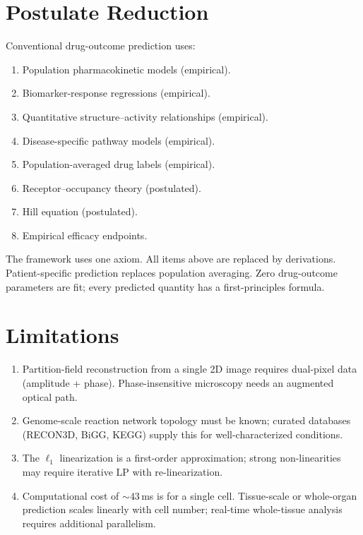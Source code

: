 \documentclass[twocolumn,10pt,a4paper]{article}
\theoremstyle{definition}
\theoremstyle{remark}
\begin{document}
\section{Postulate Reduction}

Conventional drug-outcome prediction uses:
\begin{enumerate}[leftmargin=*,nosep]
    \item Population pharmacokinetic models (empirical).
    \item Biomarker-response regressions (empirical).
    \item Quantitative structure--activity relationships (empirical).
    \item Disease-specific pathway models (empirical).
    \item Population-averaged drug labels (empirical).
    \item Receptor--occupancy theory (postulated).
    \item Hill equation (postulated).
    \item Empirical efficacy endpoints.
\end{enumerate}

The framework uses one axiom. All items above are replaced by derivations. Patient-specific prediction replaces population averaging. Zero drug-outcome parameters are fit; every predicted quantity has a first-principles formula.

\section{Limitations}

\begin{enumerate}[leftmargin=*,nosep]
    \item Partition-field reconstruction from a single 2D image requires dual-pixel data (amplitude + phase). Phase-insensitive microscopy needs an augmented optical path.
    \item Genome-scale reaction network topology must be known; curated databases (RECON3D, BiGG, KEGG) supply this for well-characterized conditions.
    \item The $\ell_1$ linearization is a first-order approximation; strong non-linearities may require iterative LP with re-linearization.
    \item Computational cost of $\sim 43$\,ms is for a single cell. Tissue-scale or whole-organ prediction scales linearly with cell number; real-time whole-tissue analysis requires additional parallelism.
\end{enumerate}
\end{document}
